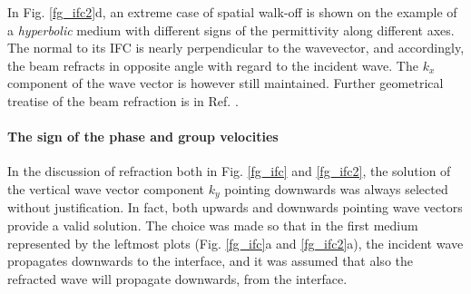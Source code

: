 In Fig. \ref{fg_ifc2}d, an extreme case of spatial walk-off is shown on the example of a \textit{hyperbolic} medium with different signs of the permittivity along different axes. %
 The normal to its IFC is nearly perpendicular to the wavevector, and accordingly, the beam refracts in opposite angle with regard to the incident wave. The $k_x$ component of the wave vector is however still maintained. Further geometrical treatise of the beam refraction is in Ref. \cite[p. 46]{klingshirn2007semiconductor}.


\paragraph{The sign of the phase and group velocities}  %
In the discussion of refraction both in Fig. \ref{fg_ifc} and \ref{fg_ifc2}, the solution of the vertical wave vector component $k_y$ pointing downwards was always selected without justification. In fact, both upwards and downwards pointing wave vectors provide a valid solution. The choice was made so that in the first medium represented by the leftmost plots (Fig. \ref{fg_ifc}a and \ref{fg_ifc2}a), the incident wave propagates downwards to the interface, and it was assumed that also the refracted wave will propagate downwards, from the interface.

